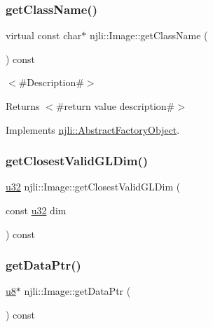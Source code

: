 \subsubsection{\texorpdfstring{get\+Class\+Name()}{getClassName()}}
{\footnotesize\ttfamily virtual const char$\ast$ njli\+::\+Image\+::get\+Class\+Name (\begin{DoxyParamCaption}{ }\end{DoxyParamCaption}) const\hspace{0.3cm}{\ttfamily [virtual]}}

$<$\#\+Description\#$>$

\begin{DoxyReturn}{Returns}
$<$\#return value description\#$>$ 
\end{DoxyReturn}


Implements \mbox{\hyperlink{classnjli_1_1_abstract_factory_object_af4151e41b80d5bc3fc42822c67fc2278}{njli\+::\+Abstract\+Factory\+Object}}.

\mbox{\label{classnjli_1_1_image_abe53fce5ad9ff94848f5f1638079b94a}} 
\subsubsection{\texorpdfstring{get\+Closest\+Valid\+G\+L\+Dim()}{getClosestValidGLDim()}}
{\footnotesize\ttfamily \mbox{\hyperlink{_util_8h_a10e94b422ef0c20dcdec20d31a1f5049}{u32}} njli\+::\+Image\+::get\+Closest\+Valid\+G\+L\+Dim (\begin{DoxyParamCaption}\item[{const \mbox{\hyperlink{_util_8h_a10e94b422ef0c20dcdec20d31a1f5049}{u32}}}]{dim }\end{DoxyParamCaption}) const\hspace{0.3cm}{\ttfamily [protected]}}

\mbox{\label{classnjli_1_1_image_a447f4bbf6b076c459829a6aac5d85fbf}} 
\subsubsection{\texorpdfstring{get\+Data\+Ptr()}{getDataPtr()}}
{\footnotesize\ttfamily \mbox{\hyperlink{_util_8h_aed742c436da53c1080638ce6ef7d13de}{u8}}$\ast$ njli\+::\+Image\+::get\+Data\+Ptr (\begin{DoxyParamCaption}{ }\end{DoxyParamCaption}) const}

